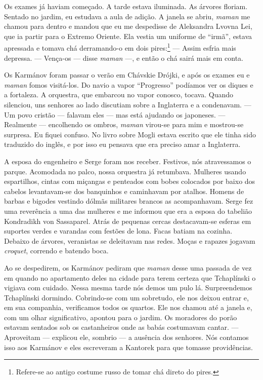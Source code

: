 Os exames já haviam começado. A tarde estava iluminada. As árvores
floriam. Sentado no jardim, eu estudava a aula de adição. A janela se
abriu, \emph{maman} me chamou para dentro e mandou que eu me despedisse
de Aleksandra Lvovna Lei, que ia partir para o Extremo Oriente. Ela
vestia um uniforme de ``irmã'', estava apressada e tomava chá
derramando-o em dois pires:\footnote{Refere-se ao antigo costume russo
  de tomar chá direto do pires.} --- Assim esfria mais depressa. ---
Vença-os --- disse \emph{maman} ---, e então o chá sairá mais em conta.

Os Karmánov foram passar o verão em Chávskie Drójki, e após os exames eu
e \emph{maman} fomos visitá-los. Do navio a vapor ``Progresso'' podíamos
ver os diques e a fortaleza. A orquestra, que embarcou no vapor conosco,
tocava. Quando silenciou, uns senhores ao lado discutiam sobre a
Inglaterra e a condenavam. --- Um povo cristão --- falavam eles --- mas
está ajudando os japoneses. --- Realmente --- encolhendo os ombros,
\emph{maman} virou-se para mim e mostrou-se surpresa. Eu fiquei confuso.
No livro sobre Mogli estava escrito que ele tinha sido traduzido do
inglês, e por isso eu pensava que era preciso amar a Inglaterra.

A esposa do engenheiro e Serge foram nos receber. Festivos, nós
atravessamos o parque. Acomodada no palco, nossa orquestra já retumbava.
Mulheres usando espartilhos, cintas com miçangas e penteados com bobes
colocados por baixo dos cabelos levantavam-se dos banquinhos e
caminhavam por atalhos. Homens de barbas e bigodes vestindo dólmãs
militares brancos as acompanhavam. Serge fez uma reverência a uma das
mulheres e me informou que era a esposa do tabelião Kondradikh von
Sassaparel. Atrás de pequenas cercas destacavam-se esferas em suportes
verdes e varandas com festões de lona. Facas batiam na cozinha. Debaixo
de árvores, veranistas se deleitavam nas redes. Moças e rapazes jogavam
\emph{croquet}, correndo e batendo boca.

Ao se despedirem, os Karmánov pediram que \emph{maman} desse uma passada
de vez em quando no apartamento deles na cidade para terem certeza que
Tchaplínski o vigiava com cuidado. Nessa mesma tarde nós demos um pulo
lá. Surpreendemos Tchaplínski dormindo. Cobrindo-se com um sobretudo,
ele nos deixou entrar e, em sua companhia, verificamos todos os quartos.
Ele nos chamou até a janela e, com um olhar significativo, apontou para
o jardim. Os moradores do porão estavam sentados sob os castanheiros
onde as babás costumavam cantar. --- Aproveitam --- explicou ele,
sombrio --- a ausência dos senhores. Nós contamos isso aos Karmánov e
eles escreveram a Kantorek para que tomasse providências.

